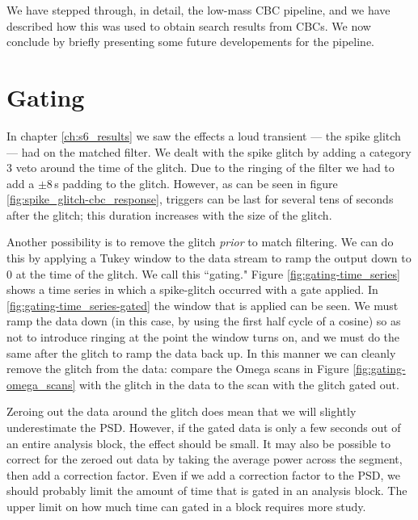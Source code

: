 
We have stepped through, in detail, the low-mass \ac{CBC} pipeline, and we have
described how this was used to obtain search results from \acp{CBC}. We now
conclude by briefly presenting some future developements for the pipeline.

\section{Gating}

In chapter \ref{ch:s6_results} we saw the effects a loud transient --- the
spike glitch --- had on the matched filter. We dealt with the spike glitch by
adding a category 3 veto around the time of the glitch. Due to the ringing of
the filter we had to add a $\pm 8\,$s padding to the glitch. However, as can be
seen in figure \ref{fig:spike_glitch-cbc_response}, triggers can be last for
several tens of seconds after the glitch; this duration increases with the size
of the glitch.

Another possibility is to remove the glitch \emph{prior} to match filtering. We
can do this by applying a Tukey window to the data stream to ramp the output
down to $0$ at the time of the glitch. We call this ``gating." Figure
\ref{fig:gating-time_series} shows a time series in which a spike-glitch
occurred with a gate applied.  In \ref{fig:gating-time_series-gated} the window
that is applied can be seen. We must ramp the data down (in this case, by using
the first half cycle of a cosine) so as not to introduce ringing at the point
the window turns on, and we must do the same after the glitch to ramp the data
back up. In this manner we can cleanly remove the glitch from the data: compare
the Omega scans in Figure \ref{fig:gating-omega_scans} with the glitch in the
data to the scan with the glitch gated out.

Zeroing out the data around the glitch does mean that we will slightly
underestimate the \ac{PSD}. However, if the gated data is only a few seconds
out of an entire analysis block, the effect should be small. It may also be
possible to correct for the zeroed out data by taking the average power across
the segment, then add a correction factor. Even if we add a correction factor
to the \ac{PSD}, we should probably limit the amount of time that is gated in
an analysis block. The upper limit on how much time can gated in a block
requires more study.

